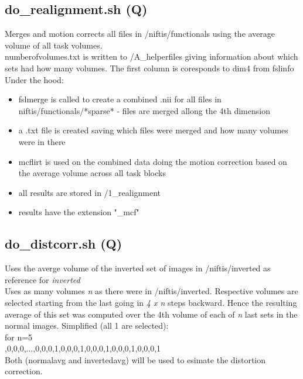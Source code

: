 \documentclass[12pt,a4paper]{scrartcl}
\begin{document}
\subsection{do\_realignment.sh (Q)}
\label{sec:realign}
Merges and motion corrects all files in /niftis/functionals using the average volume of all task volumes.\\

\noindent numberofvolumes.txt is written to /A\_helperfiles giving information about which sets had how many volumes. The first column is coresponds to dim4 from fslinfo\\

\noindent Under the hood:
\begin{itemize}
\item fslmerge is called to create a combined .nii for all files in niftis/functionals/*sparse* - files are merged allong the 4th dimension
\item a .txt file is created saving which files were merged and how many volumes were in there
\item mcflirt is used on the combined data doing the motion correction based on the average volume across all task blocks
\item all results are stored in /1\_realignment
\item results have the extension "\_mcf"
\end{itemize}

\subsection{do\_distcorr.sh (Q)}
\label{sec:distcorr}
Uses the averge volume of the inverted set of images in /niftis/inverted as reference for \textit{inverted}\\

\noindent Uses as many volumes \textit{n} as there were in /niftis/inverted. Respective volumes are selected starting from the last going in \textit{4 x n} steps backward. Hence the resulting average of this set was computed over the 4th volume of each of \textit{n} last sets in the normal images. Simplified (all 1 are selected):\\

\noindent for n=5\\

,0,0,0,...,0,0,0,1,0,0,0,1,0,0,0,1,0,0,0,1,0,0,0,1\\

\noindent Both (normalavg and invertedavg) will be used to esimate the distortion correction.\\
\end{document}
